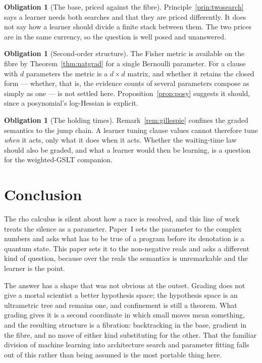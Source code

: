 \documentclass[11pt,a4paper]{article}
\theoremstyle{plain}
\theoremstyle{definition}
\newtheorem{obligation}[theorem]{Obligation}
\theoremstyle{remark}
\begin{document}
\begin{obligation}[The base, priced against the fibre]\label{ob:basefibre}
Principle~\ref{prin:twosearch} says a learner needs both searches and that they
are priced differently. It does not say how a learner should divide a finite stack
between them. The two prices are in the same currency, so the question is well
posed and unanswered.
\end{obligation}

\begin{obligation}[Second-order structure]\label{ob:second}
The Fisher metric is available on the fibre by Theorem~\ref{thm:natgrad} for a
single Bernoulli parameter. For a clause with $d$ parameters the metric is a
$d\times d$ matrix, and whether it retains the closed form --- whether, that is,
the evidence counts of several parameters compose as simply as one --- is not
settled here. Proposition~\ref{prop:posy} suggests it should, since a posynomial's
log-Hessian is explicit.
\end{obligation}

\begin{obligation}[The holding times]\label{ob:holding}
Remark~\ref{rem:gillespie} confines the graded semantics to the jump chain. A
learner tuning clause values cannot therefore tune \emph{when} it acts, only what
it does when it acts. Whether the waiting-time law should also be graded, and
what a learner would then be learning, is a question for the weighted-GSLT
companion.
\end{obligation}

\section{Conclusion}\label{sec:conc}

The rho calculus is silent about how a race is resolved, and this line of work
treats the silence as a parameter. Paper~I sets the parameter to the complex
numbers and asks what has to be true of a program before its denotation is a
quantum state. This paper sets it to the non-negative reals and asks a different
kind of question, because over the reals the semantics is unremarkable and the
learner is the point.

The answer has a shape that was not obvious at the outset. Grading does not give
a mortal scientist a better hypothesis space; the hypothesis space is an
ultrametric tree and remains one, and confinement is still a theorem. What grading
gives it is a second coordinate in which small moves mean something, and the
resulting structure is a fibration: backtracking in the base, gradient in the
fibre, and no move of either kind substituting for the other. That the familiar
division of machine learning into architecture search and parameter fitting falls
out of this rather than being assumed is the most portable thing here.
\end{document}
